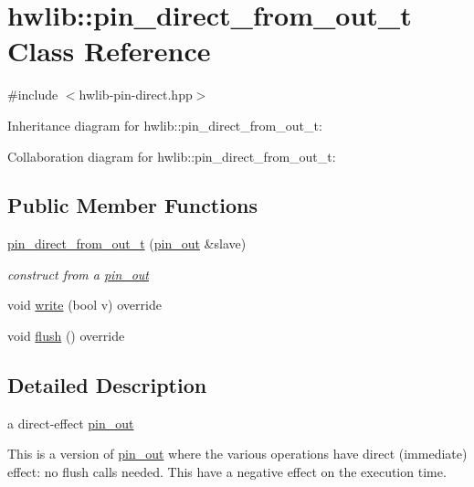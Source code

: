 \hypertarget{classhwlib_1_1pin__direct__from__out__t}{}\section{hwlib\+:\+:pin\+\_\+direct\+\_\+from\+\_\+out\+\_\+t Class Reference}
\label{classhwlib_1_1pin__direct__from__out__t}


{\ttfamily \#include $<$hwlib-\/pin-\/direct.\+hpp$>$}



Inheritance diagram for hwlib\+:\+:pin\+\_\+direct\+\_\+from\+\_\+out\+\_\+t\+:


Collaboration diagram for hwlib\+:\+:pin\+\_\+direct\+\_\+from\+\_\+out\+\_\+t\+:
\subsection*{Public Member Functions}
\begin{DoxyCompactItemize}
\item 
\mbox{\label{classhwlib_1_1pin__direct__from__out__t_a51c31c8a80e308d7f7b1f82f0a0e9e78}} 
\hyperlink{classhwlib_1_1pin__direct__from__out__t_a51c31c8a80e308d7f7b1f82f0a0e9e78}{pin\+\_\+direct\+\_\+from\+\_\+out\+\_\+t} (\hyperlink{classhwlib_1_1pin__out}{pin\+\_\+out} \&slave)
\begin{DoxyCompactList}\small\item\em construct from a \hyperlink{classhwlib_1_1pin__out}{pin\+\_\+out} \end{DoxyCompactList}\item 
void \hyperlink{classhwlib_1_1pin__direct__from__out__t_aa6a52997e8ceb4c0c6489253f84264db}{write} (bool v) override
\item 
void \hyperlink{classhwlib_1_1pin__direct__from__out__t_af623d47b7d7b8b0878a9ac359a3668d8}{flush} () override
\end{DoxyCompactItemize}


\subsection{Detailed Description}
a direct-\/effect \hyperlink{classhwlib_1_1pin__out}{pin\+\_\+out}

This is a version of \hyperlink{classhwlib_1_1pin__out}{pin\+\_\+out} where the various operations have direct (immediate) effect\+: no flush calls needed. This have a negative effect on the execution time.

